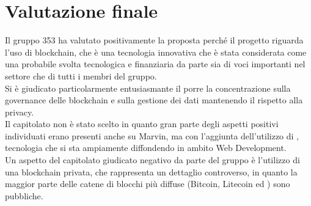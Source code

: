 \documentclass[StudioDiFattibilità.tex]{subfiles}
\begin{document}
\section{Valutazione finale}
Il gruppo 353 ha valutato positivamente la proposta perché il progetto riguarda l'uso di blockchain, che è una tecnologia innovativa che è stata considerata come una probabile svolta tecnologica e finanziaria da parte sia di voci importanti nel settore che di tutti i membri del gruppo.\\
Si è giudicato particolarmente entusiasmante il porre la concentrazione sulla governance delle blockchain e sulla gestione dei dati mantenendo il rispetto alla privacy.\\
Il capitolato non è stato scelto in quanto gran parte degli aspetti positivi individuati erano presenti anche su Marvin, ma con l'aggiunta dell'utilizzo di , tecnologia che si sta ampiamente diffondendo in ambito Web Development.\\
Un aspetto del capitolato giudicato negativo da parte del gruppo è l'utilizzo di una blockchain privata, che rappresenta un dettaglio controverso, in quanto la maggior parte delle catene di blocchi più diffuse (Bitcoin, Litecoin ed ) sono pubbliche.
\end{document}
